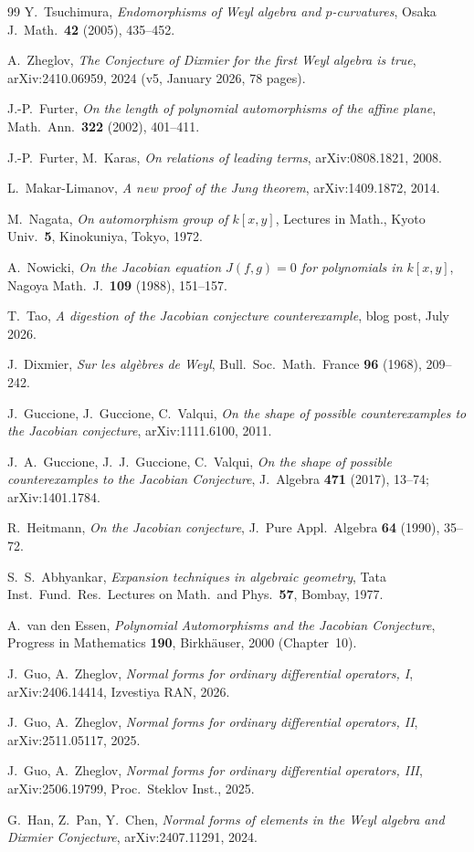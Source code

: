 \documentclass[12pt,a4paper]{article}
\theoremstyle{definition}
\begin{document}
\begin{thebibliography}{99}
Y.~Tsuchimura, \emph{Endomorphisms of Weyl algebra and $p$-curvatures},
Osaka J.~Math.\ \textbf{42} (2005), 435--452.

A.~Zheglov, \emph{The Conjecture of Dixmier for the first Weyl algebra is true},
arXiv:2410.06959, 2024 (v5, January 2026, 78 pages).

J.-P.~Furter, \emph{On the length of polynomial automorphisms of the affine plane},
Math.\ Ann.\ \textbf{322} (2002), 401--411.

J.-P.~Furter, M.~Karas, \emph{On relations of leading terms},
arXiv:0808.1821, 2008.

L.~Makar-Limanov, \emph{A new proof of the Jung theorem},
arXiv:1409.1872, 2014.

M.~Nagata, \emph{On automorphism group of $k[x,y]$}, Lectures in Math., Kyoto Univ.\
\textbf{5}, Kinokuniya, Tokyo, 1972.

A.~Nowicki, \emph{On the Jacobian equation $J(f,g) = 0$ for polynomials in $k[x,y]$},
Nagoya Math.~J.\ \textbf{109} (1988), 151--157.

T.~Tao, \emph{A digestion of the Jacobian conjecture counterexample}, blog post, July 2026.

J.~Dixmier, \emph{Sur les alg\`ebres de Weyl}, Bull.\ Soc.\ Math.\ France
\textbf{96} (1968), 209--242.

J.~Guccione, J.~Guccione, C.~Valqui, \emph{On the shape of possible counterexamples to
the Jacobian conjecture}, arXiv:1111.6100, 2011.

J.~A.~Guccione, J.~J.~Guccione, C.~Valqui, \emph{On the shape of possible
counterexamples to the Jacobian Conjecture}, J.~Algebra \textbf{471} (2017),
13--74; arXiv:1401.1784.

R.~Heitmann, \emph{On the Jacobian conjecture}, J.~Pure Appl.\ Algebra
\textbf{64} (1990), 35--72.

S.~S.~Abhyankar, \emph{Expansion techniques in algebraic geometry},
Tata Inst.\ Fund.\ Res.\ Lectures on Math.\ and Phys.\ \textbf{57}, Bombay, 1977.

A.~van den Essen, \emph{Polynomial Automorphisms and the Jacobian Conjecture},
Progress in Mathematics \textbf{190}, Birkh\"auser, 2000 (Chapter~10).

J.~Guo, A.~Zheglov, \emph{Normal forms for ordinary differential operators, I},
arXiv:2406.14414, Izvestiya RAN, 2026.

J.~Guo, A.~Zheglov, \emph{Normal forms for ordinary differential operators, II},
arXiv:2511.05117, 2025.

J.~Guo, A.~Zheglov, \emph{Normal forms for ordinary differential operators, III},
arXiv:2506.19799, Proc.\ Steklov Inst., 2025.

G.~Han, Z.~Pan, Y.~Chen, \emph{Normal forms of elements in the Weyl algebra and
Dixmier Conjecture}, arXiv:2407.11291, 2024.

\end{thebibliography}
\end{document}
